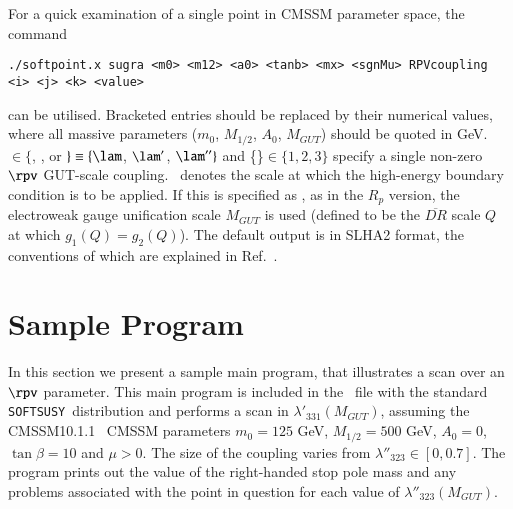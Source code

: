 \documentclass[final,3p,times,pdflatex]{elsarticle}
\def\SOFTSUSY{{\tt SOFTSUSY}}
\begin{document}
For a quick examination of a single point in CMSSM parameter space, the
command  
\small
\begin{verbatim}
./softpoint.x sugra <m0> <m12> <a0> <tanb> <mx> <sgnMu> RPVcoupling <i> <j> <k> <value>
\end{verbatim}
\normalsize
can be utilised. Bracketed entries should be replaced by their numerical
values, where all massive parameters ($m_0$, $M_{1/2}$, $A_0$, $M_{GUT}$)
should be 
quoted in GeV. ~$\in \{$, , or
$\}\equiv \{\lam$, $\lam'$, $\lam''\}$ and \{\}$\in
\{1,2,3\}$ specify a single non-zero $\rpv$ GUT-scale coupling. 
~denotes the scale at which the high-energy boundary condition is to
be applied. 
If this is 
specified as , as in the $R_p$ version, the electroweak gauge
unification scale
$M_{GUT}$ is used (defined to be the $\overline{DR}$ scale $Q$ at which $g_1(Q) =
g_2(Q)$). The default output is in SLHA2 format, the conventions of which are
explained in Ref.~\cite{Allanach:2008qq}. 


\section{Sample Program \label{sec:prog}}

In this section we present a sample main program, that illustrates 
a scan over an $\rpv$ parameter. This main program
is included in the  
~file with the standard \SOFTSUSY~distribution and performs
a scan in $\lambda'_{331}(M_{GUT})$, assuming the CMSSM10.1.1~\cite{bench}
CMSSM parameters $m_0=125$ GeV, $M_{1/2}=500$ GeV, $A_0=0$, $\tan
\beta=10$ and $\mu>0$. The  
size of the coupling varies from $\lambda''_{323} \in [0 , 0.7 ]$.
The program prints out the value of the right-handed stop pole mass and any
problems 
associated with the point in question for each value of
$\lambda''_{323}(M_{GUT})$. 
\end{document}

